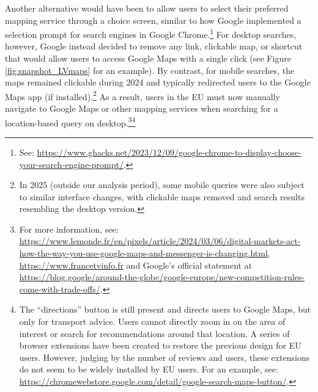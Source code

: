 \documentclass[11pt]{article}
\begin{document}
	Another alternative would have been to allow users to select their preferred mapping service through a choice screen, similar to how Google implemented a selection prompt for search engines in Google Chrome.\footnote{See: \href{https://www.ghacks.net/2023/12/09/google-chrome-to-display-choose-your-search-engine-prompt/}{https://www.ghacks.net/2023/12/09/google-chrome-to-display-choose-your-search-engine-prompt/}.} For desktop searches, however, Google instead decided to remove any link, clickable map, or shortcut that would allow users to access Google Maps with a single click (see Figure \ref{fig:snapshot_LVmaps} for an example). By contrast, for mobile searches, the maps remained clickable during 2024 and typically redirected users to the Google Maps app (if installed).\footnote{In 2025 (outside our analysis period), some mobile queries were also subject to similar interface changes, with clickable maps removed and search results resembling the desktop version.} As a result, users in the EU must now manually navigate to Google Maps or other mapping services when searching for a location-based query on desktop.\footnote{For more information, see: \href{https://www.lemonde.fr/en/pixels/article/2024/03/06/digital-markets-act-how-the-way-you-use-google-maps-and-messenger-is-changing_6591969_13.html}{https://www.lemonde.fr/en/pixels/article/2024/03/06/digital-markets-act-how-the-way-you-use-google-maps-and-messenger-is-changing.html}, \href{https://www.francetvinfo.fr/internet/google/pourquoi-google-maps-n-est-plus-integre-aux-resultats-de-recherche-google-et-quelles-solutions_6405325.html}{https://www.francetvinfo.fr} and Google's official statement at \href{https://blog.google/around-the-globe/google-europe/new-competition-rules-come-with-trade-offs/}{https://blog.google/around-the-globe/google-europe/new-competition-rules-come-with-trade-offs/}.}\footnote{The ``directions'' button is still present and directs users to Google Maps, but only for transport advice. Users cannot directly zoom in on the area of interest or search for recommendations around that location. A series of browser extensions have been created to restore the previous design for EU users. However, judging by the number of reviews and users, these extensions do not seem to be widely installed by EU users. For an example, see: \href{https://chromewebstore.google.com/detail/google-search-maps-button/edllcgchknhokighleffpipdedmpgiln?hl=en}{https://chromewebstore.google.com/detail/google-search-maps-button/}.} 
	
\end{document}

